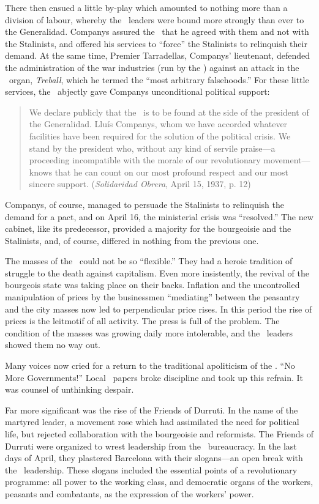 There then ensued a little by-play which amounted to nothing more than a division of labour, whereby the \CNT\ leaders were bound more strongly than ever to the Generalidad. Companys assured the \CNT\ that he agreed with them and not with the Stalinists, and offered his services to ``force'' the Stalinists to relinquish their demand. At the same time, Premier Tarradellas, Companys’ lieutenant, defended the administration of the war industries (run by the \CNT) against an attack in the \PSUC\ organ, \emph{Treball}, which he termed the ``most arbitrary falsehoods.'' For these little services, the \CNT\ abjectly gave Companys unconditional political support:

\begin{quotation}
  We declare publicly that the \CNT\ is to be found at the side of the president of the Generalidad. Lluís Companys, whom we have accorded whatever facilities have been required for the solution of the political crisis. We stand by the president who, without any kind of servile praise---a proceeding incompatible with the morale of our revolutionary movement---knows that he can count on our most profound respect and our most sincere support. (\emph{Solidaridad Obrera}, April 15, 1937, p. 12)
\end{quotation}

Companys, of course, managed to persuade the Stalinists to relinquish the demand for a pact, and on April 16, the ministerial crisis was ``resolved.'' The new cabinet, like its predecessor, provided a majority for the bourgeoisie and the Stalinists, and, of course, differed in nothing from the previous one.

The masses of the \CNT\ could not be so ``flexible.'' They had a heroic tradition of struggle to the death against capitalism. Even more insistently, the revival of the bourgeois state was taking place on their backs. Inflation and the uncontrolled manipulation of prices by the businessmen ``mediating'' between the peasantry and the city masses now led to perpendicular price rises. In this period the rise of prices is the leitmotif of all activity. The press is full of the problem. The condition of the masses was growing daily more intolerable, and the \CNT\ leaders showed them no way out.

Many voices now cried for a return to the traditional apoliticism of the \CNT. ``No More Governments!'' Local \CNT\ papers broke discipline and took up this refrain. It was counsel of unthinking despair.

Far more significant was the rise of the Friends of Durruti. In the name of the martyred leader, a movement rose which had assimilated the need for political life, but rejected collaboration with the bourgeoisie and reformists. The Friends of Durruti were organized to wrest leadership from the \CNT\ bureaucracy. In the last days of April, they plastered Barcelona with their slogans---an open break with the \CNT\ leadership. These slogans included the essential points of a revolutionary programme: all power to the working class, and democratic organs of the workers, peasants and combatants, as the expression of the workers’ power.

